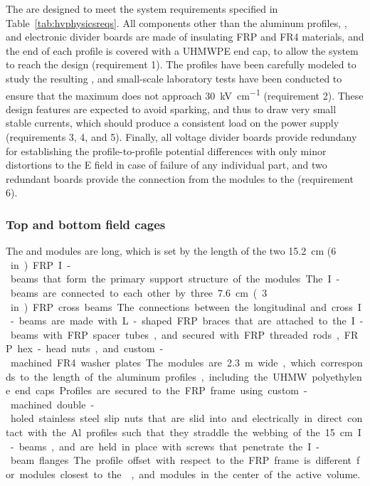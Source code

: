 The  %
are designed to %
meet the system requirements specified in Table~\ref{tab:hvphysicsreqs}. All components other than the aluminum profiles, , and electronic divider boards are made of insulating FRP and FR4 materials, and the end of each profile is covered with a UHMWPE end cap, to allow the system to reach the design  \efield{} (requirement 1). The profiles have been carefully modeled to study the resulting \efield{}, and small-scale laboratory tests have been conducted to ensure that the maximum \efield{} does not approach \SI{30}{\kV\per\cm} (requirement 2). These design features are expected to avoid sparking, and thus to draw very small stable currents, which should produce a consistent load on the power supply (requirements 3, 4, and 5). Finally, all voltage divider boards provide redundany for establishing the profile-to-profile potential differences with only minor distortions to the E field in case of failure of any individual part, and two redundant boards provide the connection from the  modules to the  (requirement 6).

\subsubsection{Top and bottom field cages}

The  and  modules are \spfcmodlen{} long, which is set by the length of the two \SI{15.2}{\cm} (\SI{6}\,in) FRP I-beams that form the primary support structure of the modules. The I-beams are connected to each other by three  \SI{7.6}{\cm} (\SI{3}\,in) FRP cross beams. The connections between the longitudinal and cross I-beams are made with L-shaped FRP braces that are attached to the I-beams with FRP spacer tubes, and secured with FRP threaded rods, FRP hex-head nuts, and custom-machined FR4 washer plates.

The modules are \SI{2.3}{\m} wide, which corresponds to the length of the aluminum profiles, including the UHMW polyethylene end caps. Profiles are secured to the FRP frame using custom-machined double-holed stainless steel slip nuts that are slid into and electrically in direct contact with the Al profiles such that they straddle the webbing of the \SI{15}{\cm} I-beams, and are held in place with screws that penetrate the I-beam flanges. The profile offset with respect to the FRP frame is different for modules closest to the , %
and modules in the center of the active volume.

